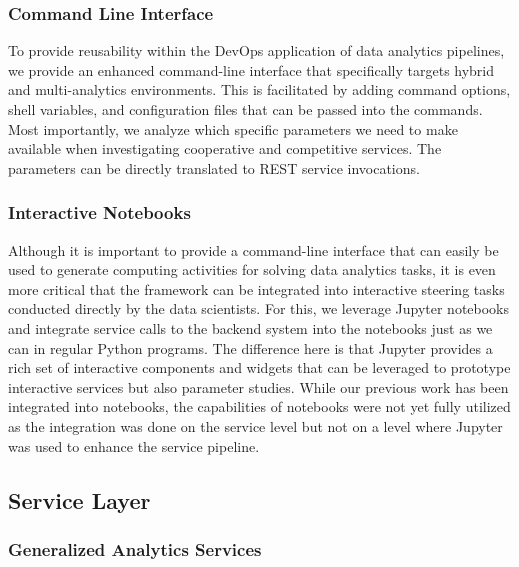 \subsubsection{Command Line Interface}

To provide reusability within the DevOps application of data analytics
pipelines, we provide an enhanced command-line interface that
specifically targets hybrid and multi-analytics environments. This is
facilitated by adding command options, shell variables, and
configuration files that can be passed into the commands.
Most importantly, we analyze which specific parameters we
need to make available when investigating cooperative and competitive
services. The parameters can be directly translated to REST service invocations.

\subsubsection{Interactive Notebooks}

Although it is important to provide a command-line interface that can
easily be used to generate computing activities for solving data
analytics tasks, it is even more critical that the framework can be
integrated into interactive steering tasks conducted directly by the
data scientists. For this, we leverage Jupyter notebooks and integrate
service calls to the backend system into the notebooks just as we can
in regular Python programs. The difference here is that Jupyter
provides a rich set of interactive components and widgets that can be
leveraged to prototype interactive services but also parameter
studies. While our
previous work has been integrated into notebooks, the capabilities of
notebooks were not yet fully utilized as the integration was done on
the service level but not on a level where Jupyter was used to enhance
the service pipeline. 

\subsection {Service Layer}

\subsubsection{Generalized Analytics Services}
\label{s:gas}

